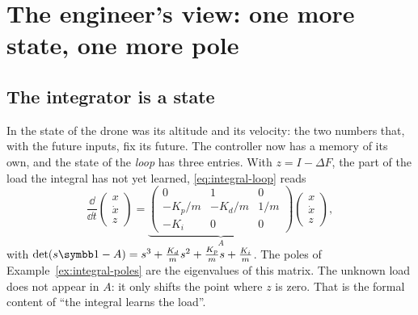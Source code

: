 \section{The engineer's view: one more state, one more pole}

\subsection{The integrator is a state}
In  the state of the drone was its altitude and its velocity: the two numbers that, with the future inputs, fix its future. The controller now has a memory of its own, and the state of the \emph{loop} has three entries. With $z = I - \Delta F$, the part of the load the integral has not yet learned, \cref{eq:integral-loop} reads
\begin{equation}\label{eq:integral-state}
  \frac{\dd}{\dd t}\begin{pmatrix} x \\ \dot x \\ z \end{pmatrix}
  = \underbrace{\begin{pmatrix} 0 & 1 & 0 \\ -K_p/m & -K_d/m & 1/m \\ -K_i & 0 & 0 \end{pmatrix}}_{A}
  \begin{pmatrix} x \\ \dot x \\ z \end{pmatrix},
\end{equation}
with $\det(s\Id - A) = s^3 + \frac{K_d}{m}s^2 + \frac{K_p}{m}s + \frac{K_i}{m}$.
The poles of Example~\ref{ex:integral-poles} are the eigenvalues of this matrix. The unknown load does not appear in $A$: it only shifts the point where $z$ is zero. That is the formal content of \enquote{the integral learns the load}.


